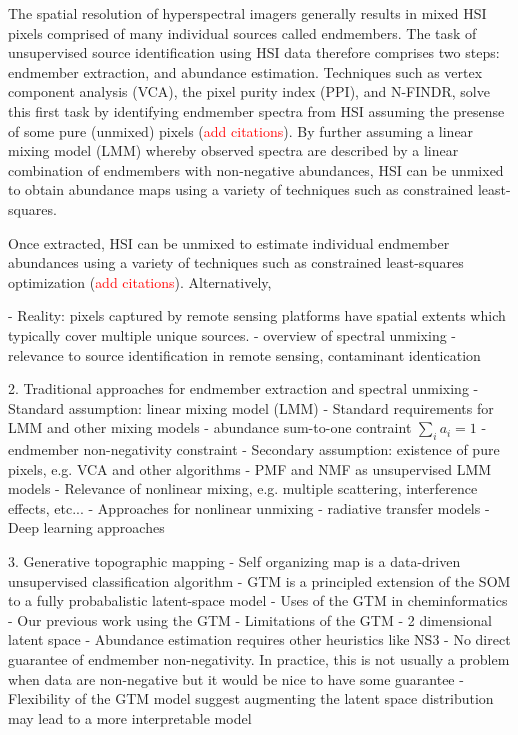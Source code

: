 \documentclass[remotesensing,article,submit,pdftex,moreauthors]{Definitions/mdpi}
\begin{document}
The spatial resolution of hyperspectral imagers generally results in mixed HSI pixels comprised of many individual sources called endmembers. The task of unsupervised source identification using HSI data therefore comprises two steps: endmember extraction, and abundance estimation. Techniques such as vertex component analysis (VCA), the pixel purity index (PPI), and N-FINDR, solve this first task by identifying endmember spectra from HSI assuming the presense of some pure (unmixed) pixels (\textcolor{red}{add citations}). By further assuming a linear mixing model (LMM) whereby observed spectra are described by a linear combination of endmembers with non-negative abundances, HSI can be unmixed to obtain abundance maps using a variety of techniques such as constrained least-squares. 

Once extracted, HSI can be unmixed to estimate individual endmember abundances using a variety of techniques such as constrained least-squares optimization (\textcolor{red}{add citations}). Alternatively,



- Reality: pixels captured by remote sensing platforms have spatial extents which typically cover multiple unique sources. 
- overview of spectral unmixing
- relevance to source identification in remote sensing, contaminant identication 



2. Traditional approaches for endmember extraction and spectral unmixing
- Standard assumption: linear mixing model (LMM)
- Standard requirements for LMM and other mixing models
    - abundance sum-to-one contraint $\sum_i a_i = 1$
    - endmember non-negativity constraint
- Secondary assumption: existence of pure pixels, e.g. VCA and other algorithms
- PMF and NMF as unsupervised LMM models 
- Relevance of nonlinear mixing, e.g. multiple scattering, interference effects, etc...
- Approaches for nonlinear unmixing
    - radiative transfer models
    - Deep learning approaches

3. Generative topographic mapping
- Self organizing map is a data-driven unsupervised classification algorithm
- GTM is a principled extension of the SOM to a fully probabalistic latent-space model
- Uses of the GTM in cheminformatics
- Our previous work using the GTM
- Limitations of the GTM
    - 2 dimensional latent space
    - Abundance estimation requires other heuristics like NS3
    - No direct guarantee of endmember non-negativity. In practice, this is not usually a problem when data are non-negative but it would be nice to have some guarantee
- Flexibility of the GTM model suggest augmenting the latent space distribution may lead to a more interpretable model
\end{document}

